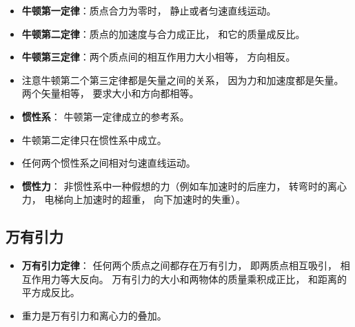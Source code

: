 \begin{itemize}
\item \textbf{牛顿第一定律}：质点合力为零时， 静止或者匀速直线运动。
\item \textbf{牛顿第二定律}：质点的加速度与合力成正比， 和它的质量成反比。
\item \textbf{牛顿第三定律}：两个质点间的相互作用力大小相等， 方向相反。
\item 注意牛顿第二个第三定律都是矢量之间的关系， 因为力和加速度都是矢量。 两个矢量相等， 要求大小和方向都相等。
\item \textbf{惯性系}： 牛顿第一定律成立的参考系。
\item 牛顿第二定律只在惯性系中成立。
\item 任何两个惯性系之间相对匀速直线运动。
\item \textbf{惯性力}： 非惯性系中一种假想的力（例如车加速时的后座力， 转弯时的离心力， 电梯向上加速时的超重， 向下加速时的失重）。
\end{itemize}

\subsection{万有引力}
\begin{itemize}
\item \textbf{万有引力定律}： 任何两个质点之间都存在万有引力， 即两质点相互吸引， 相互作用力等大反向。 万有引力的大小和两物体的质量乘积成正比， 和距离的平方成反比。
\item 重力是万有引力和离心力的叠加。
\end{itemize}
